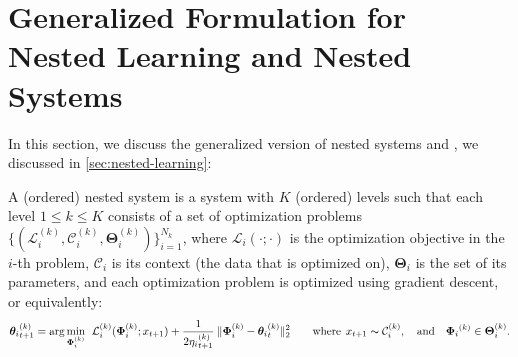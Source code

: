 \section{Generalized Formulation for Nested Learning and Nested Systems}
In this section, we discuss the generalized version of nested systems and \nsam, we discussed in \autoref{sec:nested-learning}:


\begin{dfn}
    A (ordered) nested system is a system with $K$ (ordered) levels such that each level $1 \leq k \leq K$ consists of a set of optimization problems $\{ (\mathcal{L}^{(k)}_{i},  \mathcal{C}^{(k)}_i, \boldsymbol{\Theta}^{(k)}_{i}) \}_{i = 1}^{N_k}$, where $\mathcal{L}_{i}(\cdot; \cdot)$ is the optimization objective in the $i$-th problem, $\mathcal{C}_i$ is its context (the data that is optimized on), $\boldsymbol{\Theta}_{i}$ is the set of its parameters, and each optimization problem is optimized using gradient descent, or equivalently:
    \begin{align}
        {\boldsymbol{\theta}_{i}}^{(k)}_{t+1} = \arg\min_{\boldsymbol{\Phi}^{(k)}_{i}} \:\:  \mathcal{L}^{(k)}_i(\boldsymbol{\Phi}^{(k)}_{i}; x_{t+1}) + \frac{1}{2{\eta_{i}}^{(k)}_{t+1}}\:\|\boldsymbol{\Phi}^{(k)}_{i} - {\boldsymbol{\theta}_{i}}^{(k)}_{t} \|^{2}_2 \qquad \text{where}\:\: x_{t+1} \thicksim \mathcal{C}^{(k)}_i, \quad \text{and} \quad {\boldsymbol{\Phi}_{i}}^{(k)} \in  \boldsymbol{\Theta}^{(k)}_{i}.
    \end{align}
\end{dfn} 









